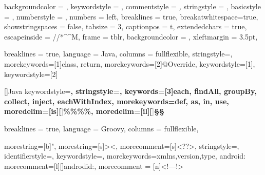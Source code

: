 
\usepackage{listings}


\captionsetup[lstlisting]{
    format = listing
}

\lstset 
{
    backgroundcolor = \color{white},
    keywordstyle = \color{blue},
    commentstyle = \color{code_gray}\textit,
    stringstyle = \color{green},
    basicstyle = \scriptsize\ttfamily,
    numberstyle = \tiny,
    numbers = left,
    breaklines = true,
    breakatwhitespace=true,
    showstringspaces = false,
    tabsize = 3,
    captionpos = t,
    extendedchars = true,
    escapeinside = {//*}{\^^M}, %
    frame = tblr,
    backgroundcolor = \color{gray!5},
    xleftmargin = 3.5pt,
}

\renewcommand{\lstlistingname}{Code Snippet}

\captionsetup[lstlisting]{format = listing, labelfont = white, textfont = white}


{
    breaklines = true,
    language = Java,
    columns = fullflexible,
    stringstyle=\color{code_blue},
    morekeywords=[1]{class, return},
    morekeywords=[2]{@Override},
    keywordstyle=[1]\color{code_red},
    keywordstyle=[2]\color{Bittersweet}
}

[]{Java}{%
  keywordstyle=\color{code_blue}\bfseries,
  stringstyle=\color{code_red}\ttfamily,
  keywords=[3]{each, findAll, groupBy, collect, inject, eachWithIndex},
  morekeywords={def, as, in, use},
  moredelim=[is][\textcolor{darkgray}]{\%\%}{\%\%},
  moredelim=[il][\textcolor{darkgray}]{§§}
}

{
    breaklines = true,
    language = Groovy,
    columns = fullflexible,
}

{
  morestring=[b]",
  morestring=[s]{>}{<},
  morecomment=[s]{<?}{?>},
  stringstyle=\color{black},
  identifierstyle=\color{code_darkblue},
  keywordstyle=\color{code_cyan},
  morekeywords={xmlns,version,type, android:}
  morecomment=[l][\color{code_red}\ttfamily]{androdid:}, 
  morecomment = [n]{<!--}{--!>}
}

